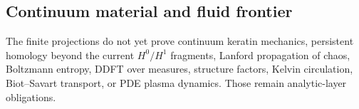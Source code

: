 \subsection{Continuum material and fluid frontier}

\begin{theorem}\label{thm:continuum-material-fluid-frontier}\notready{}
The finite projections do not yet prove continuum keratin mechanics, persistent
homology beyond the current \(H^0/H^1\) fragments, Lanford propagation of
chaos, Boltzmann entropy, DDFT over measures, structure factors, Kelvin
circulation, Biot--Savart transport, or PDE plasma dynamics. Those remain
analytic-layer obligations.
\end{theorem}
